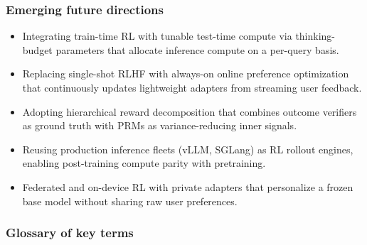 \subsubsection{Emerging future directions}\label{emerging-future-directions}

\begin{itemize}
\tightlist
\item
  Integrating train-time RL with tunable test-time compute via thinking-budget parameters that allocate inference compute on a per-query basis.
\item
  Replacing single-shot RLHF with always-on online preference optimization that continuously updates lightweight adapters from streaming user feedback.
\item
  Adopting hierarchical reward decomposition that combines outcome verifiers as ground truth with PRMs as variance-reducing inner signals.
\item
  Reusing production inference fleets (vLLM, SGLang) as RL rollout engines, enabling post-training compute parity with pretraining.
\item
  Federated and on-device RL with private adapters that personalize a frozen base model without sharing raw user preferences.
\end{itemize}

\subsubsection{Glossary of key terms}\label{glossary-of-key-terms}

